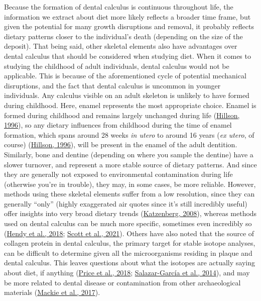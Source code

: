 \documentclass[
  b5paper,
]{book}
\begin{document}
Because the formation of dental calculus is continuous throughout life,
the information we extract about diet more likely reflects a broader
time frame, but given the potential for many growth disruptions and
removal, it probably reflects dietary patterns closer to the
individual's death (depending on the size of the deposit). That being
said, other skeletal elements also have advantages over dental calculus
that should be considered when studying diet. When it comes to studying
the childhood of adult individuals, dental calculus would not be
applicable. This is because of the aforementioned cycle of potential
mechanical disruptions, and the fact that dental calculus is uncommon in
younger individuals. Any calculus visible on an adult skeleton is
unlikely to have formed during childhood. Here, enamel represents the
most appropriate choice. Enamel is formed during childhood and remains
largely unchanged during life
(\protect\hyperlink{ref-hillsonDentalAnthropology1996}{Hillson, 1996}),
so any dietary influences from childhood during the time of enamel
formation, which spans around 28 weeks \emph{in utero} to around 16
years (\emph{ex utero}, of course)
(\protect\hyperlink{ref-hillsonDentalAnthropology1996}{Hillson, 1996}),
will be present in the enamel of the adult dentition. Similarly, bone
and dentine (depending on where you sample the dentine) have a slower
turnover, and represent a more stable source of dietary patterns. And
since they are generally not exposed to environmental contamination
during life (otherwise you're in trouble), they may, in some cases, be
more reliable. However, methods using these skeletal elements suffer
from a low resolution, since they can generally ``only'' (highly
exaggerated air quotes since it's still incredibly useful) offer
insights into very broad dietary trends
(\protect\hyperlink{ref-katzenbergStableIsotope2008}{Katzenberg, 2008}),
whereas methods used on dental calculus can be much more specific,
sometimes even incredibly so
(\protect\hyperlink{ref-hendyProteomicCalculus2018}{Hendy et al., 2018};
\protect\hyperlink{ref-scottExoticFoods2021}{Scott et al., 2021}).
Others have also noted that the source of collagen protein in dental
calculus, the primary target for stable isotope analyses, can be
difficult to determine given all the microorganisms residing in plaque
and dental calculus. This leaves questions about what the isotopes are
actually saying about diet, if anything
(\protect\hyperlink{ref-priceTestingValidity2018}{Price et al., 2018};
\protect\hyperlink{ref-salazar-garciaDentalCalculus2014}{Salazar-García
et al., 2014}), and may be more related to dental disease or
contamination from other archaeological materials
(\protect\hyperlink{ref-mackiePreservationMetaproteome2017}{Mackie et
al., 2017}).
\end{document}
